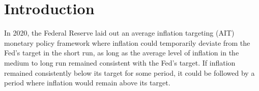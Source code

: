 \documentclass[english,authoryear,12pt]{elsarticle}
\begin{document}
%
%
%
%
%

\renewcommand{\thefootnote}{\arabic{footnote}}%
\setcounter{page}{1}%
\setcounter{footnote}{0}%


\section{\label{Intro}Introduction}
In 2020, the Federal Reserve laid out an average inflation targeting (AIT) monetary policy framework where inflation could temporarily deviate from the Fed's target in the short run, as long as the average level of inflation in the medium to long run remained consistent with the Fed's target. If inflation remained consistently below its target for some period, it could be followed by a period where inflation would remain above its target.
\end{document}
